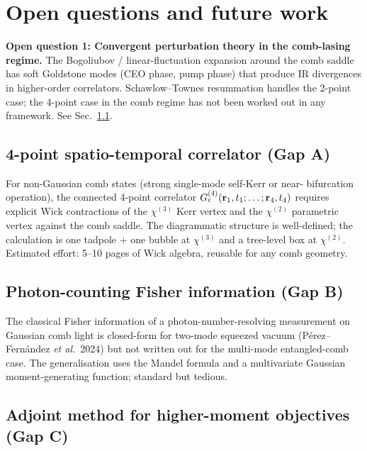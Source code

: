\documentclass[11pt]{article}
\begin{document}
\section{Open questions and future work}
\label{sec:open}

\begin{open}
\textbf{Open question 1: Convergent perturbation theory in the
comb-lasing regime.}
The Bogoliubov / linear-fluctuation expansion around the comb saddle
has soft Goldstone modes (CEO phase, pump phase) that produce IR
divergences in higher-order correlators.  Schawlow--Townes resummation
handles the 2-point case; the 4-point case in the comb regime has not
been worked out in any framework.  See Sec.~\ref{sec:open_4pt}.
\end{open}

\subsection{4-point spatio-temporal correlator (Gap A)}
\label{sec:open_4pt}

For non-Gaussian comb states (strong single-mode self-Kerr or near-
bifurcation operation), the connected 4-point correlator
$G^{(4)}_{\rm c}(\mathbf{r}_1,t_1;\ldots;\mathbf{r}_4,t_4)$ requires
explicit Wick contractions of the $\chi^{(3)}$ Kerr vertex and the
$\chi^{(2)}$ parametric vertex against the comb saddle.  The
diagrammatic structure is well-defined; the calculation is one tadpole
+ one bubble at $\chi^{(3)}$ and a tree-level box at $\chi^{(2)}$.
Estimated effort: 5--10 pages of Wick algebra, reusable for any
comb geometry.

\subsection{Photon-counting Fisher information (Gap B)}

The classical Fisher information of a photon-number-resolving
measurement on Gaussian comb light is closed-form for two-mode
squeezed vacuum (P\'erez--Fern\'andez \emph{et al.}\ 2024) but not
written out for the multi-mode entangled-comb case.  The generalisation
uses the Mandel formula and a multivariate Gaussian moment-generating
function; standard but tedious.

\subsection{Adjoint method for higher-moment objectives (Gap C)}
\end{document}
